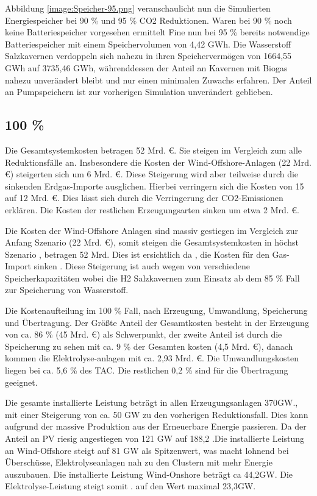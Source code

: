 Abbildung \ref{image:Speicher-95.png} veranschaulicht nun die Simulierten Energiespeicher bei 90 \% und 95 \% CO2 Reduktionen. Waren bei 90 \% noch keine Batteriespeicher vorgesehen ermittelt Fine nun bei 95 \% bereits notwendige Batteriespeicher mit einem Speichervolumen von 4,42 GWh. Die Wasserstoff Salzkavernen verdoppeln sich nahezu in ihren Speichervermögen von 1664,55 GWh auf 3735,46 GWh, währenddessen der Anteil an Kavernen mit Biogas nahezu unverändert bleibt und nur einen minimalen Zuwachs erfahren. Der Anteil an Pumpspeichern ist zur vorherigen Simulation unverändert geblieben. 

\subsection{100 \%}
%
Die Gesamtsystemkosten betragen 52 Mrd. €. Sie steigen im Vergleich zum alle Reduktionsfälle an. Insbesondere die Kosten der Wind-Offshore-Anlagen (22 Mrd. €) steigerten sich um 6 Mrd. €. Diese Steigerung wird aber teilweise durch die sinkenden Erdgas-Importe ausglichen. Hierbei verringern sich die Kosten von 15 auf 12 Mrd. €. Dies lässt sich durch die Verringerung der CO2-Emissionen erklären. Die Kosten der restlichen Erzeugungsarten sinken um etwa 2 Mrd. €.

Die Kosten der Wind-Offshore Anlagen sind massiv gestiegen im Vergleich zur Anfang Szenario (22 Mrd. €), somit steigen die Gesamtsystemkosten in höchst Szenario , betragen 52 Mrd. Dies ist ersichtlich da , die Kosten für den Gas-Import sinken . Diese Steigerung  ist auch wegen von verschiedene Speicherkapazitäten wobei die H2 Salzkavernen zum Einsatz ab dem 85 \% Fall zur Speicherung von Wasserstoff.

Die Kostenaufteilung im 100 \% Fall, nach Erzeugung, Umwandlung, Speicherung und Übertragung. Der Größte Anteil der Gesamtkosten besteht in der Erzeugung von ca. 86 \% (45 Mrd. €) als Schwerpunkt, der zweite Anteil ist durch die Speicherung zu sehen mit ca. 9 \% der Gesamten kosten (4,5 Mrd. €), danach kommen die Elektrolyse-anlagen mit ca. 2,93 Mrd. €. Die Umwandlungskosten liegen bei ca. 5,6 \% des TAC. Die restlichen 0,2 \% sind für die Übertragung geeignet.

Die gesamte installierte Leistung beträgt in allen Erzeugungsanlagen 370GW., mit einer Steigerung von ca. 50 GW zu den vorherigen Reduktionsfall. Dies kann aufgrund der massive Produktion aus der Erneuerbare Energie passieren. Da der Anteil an PV riesig angestiegen von 121 GW auf 188,2 .Die installierte Leistung an Wind-Offshore steigt  auf 81 GW als Spitzenwert, was macht lohnend bei Überschüsse, Elektrolyseanlagen nah zu den Clustern mit mehr Energie auszubauen.  Die installierte Leistung Wind-Onshore beträgt ca 44,2GW. Die Elektrolyse-Leistung steigt somit . auf den Wert maximal  23,3GW.

